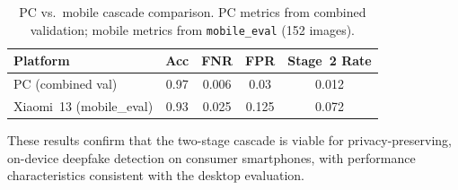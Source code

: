 \begin{table}[h]
  \centering
  \caption{PC vs.\ mobile cascade comparison. PC metrics from combined validation; mobile metrics from \texttt{mobile\_eval} (152 images).}
  \label{tab:pc_vs_mobile}
  {\small
  \begin{tabular}{lcccc}
    \toprule
    Platform & Acc & FNR & FPR & Stage~2 Rate \\
    \midrule
    PC (combined val) & 0.97 & 0.006 & 0.03 & 0.012 \\
    Xiaomi~13 (mobile\_eval) & 0.93 & 0.025 & 0.125 & 0.072 \\
    \bottomrule
  \end{tabular}}
\end{table}

These results confirm that the two\hyp stage cascade is viable for privacy\hyp preserving, on\hyp device deepfake detection on consumer smartphones, with performance characteristics consistent with the desktop evaluation.
